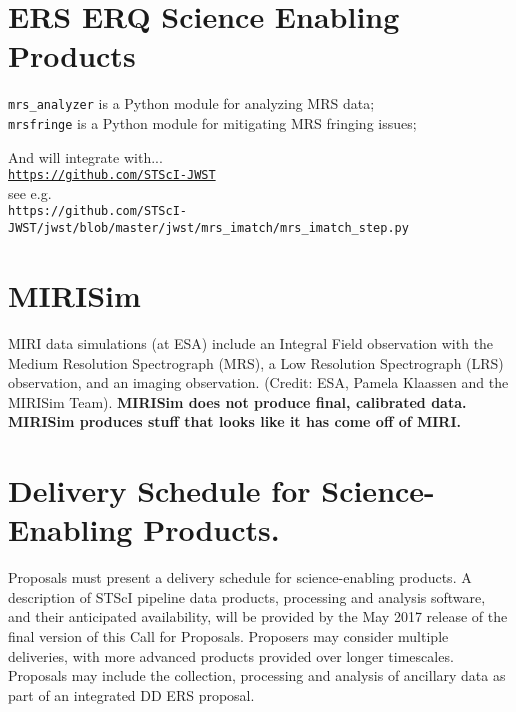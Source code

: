 \section*{ERS ERQ Science Enabling Products}
{\tt mrs\_analyzer} is  a Python module for analyzing MRS data; \\
{\tt mrsfringe} is a Python module for mitigating MRS fringing issues; \

\smallskip \smallskip
\noindent
And will integrate with...\\
\href{https://github.com/STScI-JWST}{\tt https://github.com/STScI-JWST} \\
see e.g. \\
{\tt https://github.com/STScI-JWST/jwst/blob/master/jwst/mrs\_imatch/mrs\_imatch\_step.py}\\


\section*{MIRISim}
MIRI data simulations (at ESA) include an Integral Field observation
with the Medium Resolution Spectrograph (MRS), a Low Resolution
Spectrograph (LRS) observation, and an imaging observation. (Credit:
ESA, Pamela Klaassen and the MIRISim Team).
{\bf MIRISim does not produce final, calibrated data. 
MIRISim produces stuff that looks like it has come off of MIRI.}



\iffalse
\section{Useful links}
http://astroconda.readthedocs.io/en/latest/ \\
https://www.cosmos.esa.int/web/jwst/simulations\\
https://confluence.stsci.edu/display/JWSTDADF/JWST+Data+Analysis+Development+Forum\\
https://jwst.stsci.edu/science-planning/data-analysis-toolbox\\
https://www.youtube.com/watch?v=A024z9CITZs\\
https://jwst.stsci.edu/science-planning/proposal-planning-toolbox/simulated-data\\
\fi


\section*{Delivery Schedule for Science-Enabling Products.} 
Proposals must present a delivery schedule for science-enabling products. A description of STScI pipeline data products, processing and analysis software, and their anticipated availability, will be provided by the May 2017 release of the final version of this Call for Proposals.  Proposers may consider multiple deliveries, with more advanced products provided over longer timescales. Proposals may include the collection, processing and analysis of ancillary data as part of an integrated DD ERS proposal.


